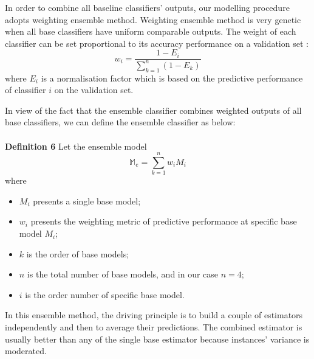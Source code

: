 \documentclass[12pt]{article}
\begin{document}
In order to combine all baseline classifiers' outputs, our modelling procedure adopts weighting ensemble method. Weighting ensemble method is very genetic when all base classifiers have uniform comparable outputs. The weight of each classifier can be set proportional to its accuracy performance on a validation set \cite{Rokach}:\\
\begin{equation}\label{reio}
	w_{i} = \frac{1 - E_{i} }{\sum_{k = 1}^{n} (1 - E_{k}) } 
\end{equation}
where $E_{i} $ is a normalisation factor which is based on the predictive performance of classifier $i$ on the validation set. 

In view of the fact that the ensemble classifier combines weighted outputs of all base classifiers, we can define the ensemble classifier as below: \\
\\
\textbf{Definition 6} Let the ensemble model \\
\begin{equation}\label{reio}
	\mathbb{M}_{e} = \sum_{k = 1}^{n} w_{i} M_{i} 
\end{equation}
where
\begin{itemize}
  \item $M_{i}$ presents a single base model;
  \item $w_{i}$ presents the weighting metric of predictive performance at specific base model $M_{i}$;
  \item $k$ is the order of base models;
  \item $n$ is the total number of base models, and in our case $n = 4$;
  \item $i$ is the order number of specific base model.\\
\end{itemize}

In this ensemble method, the driving principle is to build a couple of estimators independently and then to average their predictions. The combined estimator is usually better than any of the single base estimator because instances' variance is moderated.
\end{document}

